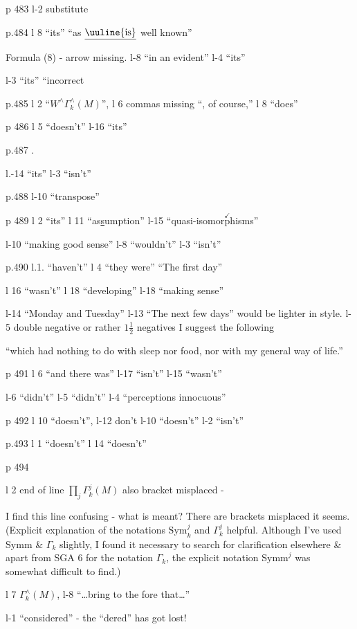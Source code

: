 
p 483 l-2 substitute

p.484 l 8 ``its'' \quad ``as $\underline{\text{\uuline{is}}}$ well known''

Formula (8) - arrow missing. \quad l-8 ``in an evident'' \quad l-4 ``its''

l-3 ``its'' \quad ``incorrect

p.485 l 2 ``$W^{\wedge}\Gamma_{k}^{\wedge}(M)$'', \quad l 6 commas missing ``, of course,'' \quad l 8 ``does''

p 486 l 5 ``doesn't'' \quad l-16 ``its''

p.487 .

l.-14 ``its'' \quad l-3 ``isn't''

p.488 l-10 ``transpose''

p 489 l 2 ``its'' \quad l 11 ``as\uline{s}umption'' \quad l-15 ``quasi-isomor$\overset{\checkmark}{\text{p}}$hisms''

l-10 ``making good sense'' \quad l-8 ``wouldn't'' \quad l-3 ``isn't''

p.490 l.1. ``haven't'' \quad l 4 ``they were'' \quad ``The first day''

l 16 ``wasn't'' \quad l 18 ``developing'' \quad l-18 ``making sense''

l-14 ``Monday and Tuesday'' \quad l-13 ``The next few days'' would be lighter in style. \quad l-5 double negative or rather $1\frac{1}{2}$ negatives I suggest the following

``which had nothing to do with sleep nor food, nor with my general way of life.''

p 491 l 6 ``and there was'' \quad l-17 ``isn't'' \quad l-15 ``wasn't''

l-6 ``didn't'' \quad l-5 ``didn't'' \quad l-4 ``perceptions innocuous''

p 492 l 10 ``doesn't'', \quad l-12 don't \quad l-10 ``doesn't'' \quad l-2 ``isn't''

p.493 l 1 ``doesn't'' \quad l 14 ``doesn't''

p 494 

l 2 end of line $\prod\limits_{j}\Gamma_{k}^{j}(M)$ \quad also bracket misplaced -

\unsure{---} I find this line confusing - what is meant? There are brackets misplaced it seems. (Explicit explanation of the notations $\mathrm{Sym}_{k}^{j}$ and $\Gamma_{k}^{j}$   helpful. Although I've used $\mathrm{Symm}$ \& $\Gamma_{k}$\deleted{\unsure{,}} slightly, I  found  it necessary to search for clarification elsewhere \& apart from SGA 6 for the notation $\Gamma_{k}$, the explicit notation \deleted{\unsure{$\Gamma$}} $\mathrm{Symm}^{j}$ was somewhat difficult to find.)

l 7 $\Gamma_{k}^{\wedge}(M)$, \quad l-8 ``\ldots{}bring to the fore that\ldots''

l-1 ``considered'' - the ``dered'' has got lost!
